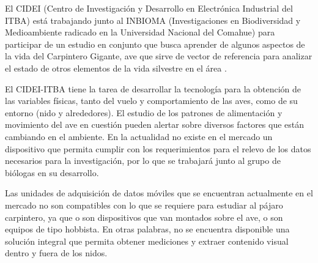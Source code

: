 


El CIDEI (Centro de Investigación y Desarrollo en Electrónica Industrial del ITBA) está trabajando junto al INBIOMA (Investigaciones en Biodiversidad y Medioambiente radicado en la Universidad Nacional del Comahue) para participar de un estudio en conjunto que busca aprender de algunos aspectos de la vida del Carpintero Gigante, ave que sirve de vector de referencia para analizar el estado de otros elementos de la vida silvestre en el área \cite{ref:PaperValeriaOjeda}.

El CIDEI-ITBA tiene la tarea de desarrollar la tecnología para la obtención de las variables físicas, tanto del vuelo y comportamiento de las aves, como de su entorno (nido y alrededores). El estudio de los patrones de alimentación y movimiento del ave en cuestión pueden alertar sobre diversos factores que están cambiando en el ambiente. En la actualidad no existe en el mercado un dispositivo que permita cumplir con los requerimientos para el relevo de los datos necesarios para la investigación, por lo que se trabajará junto al grupo de biólogas en su desarrollo.

Las unidades de adquisición de datos móviles que se encuentran actualmente en el mercado no son compatibles con lo que se requiere para estudiar al pájaro carpintero, ya que o son dispositivos que van montados sobre el ave, o son equipos de tipo hobbista. En otras palabras, no se encuentra disponible una solución integral que permita obtener mediciones y extraer contenido visual dentro y fuera de los nidos.


%